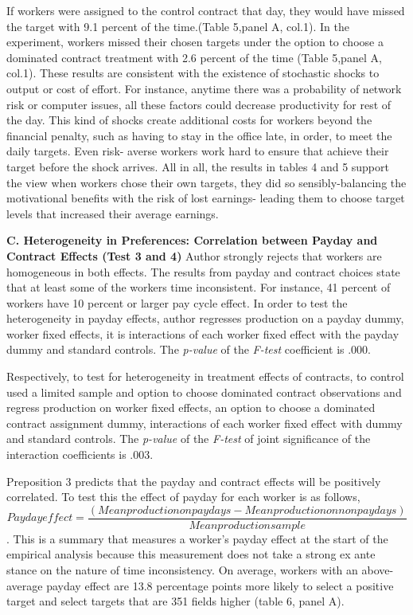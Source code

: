 \documentclass[a4paper,12pt]{article}
\begin{document}
If workers were assigned to the control contract that day, they would have missed the target with 9.1 percent of the time.(Table 5,panel A, col.1). In the experiment, workers missed their chosen targets under the option to choose a dominated contract treatment with 2.6 percent of the time (Table 5,panel A, col.1). These results are consistent with the existence of stochastic shocks to output or cost of effort. For instance, anytime there was a probability of network risk or computer issues, all these factors could decrease productivity for rest of the day. This kind of shocks create additional costs for workers beyond the financial penalty, such as having to stay in the office late, in order, to meet the daily targets. Even risk- averse workers work hard to ensure that achieve their target before the shock arrives. All in all, the results in tables 4 and 5 support the view when workers chose their own targets, they did so sensibly-balancing the motivational benefits with the risk of lost earnings- leading them to choose target levels that increased their average earnings.   


\textbf{C. Heterogeneity in Preferences: Correlation between Payday and Contract Effects (Test 3 and 4)}
Author strongly rejects that workers are homogeneous in both effects. The results from payday and contract choices state that at least some of the workers time inconsistent. For instance, 41 percent of workers have 10 percent or larger pay cycle effect. 
In order to test the heterogeneity in payday effects, author regresses production on a payday dummy, worker fixed effects, it is interactions of each worker fixed effect with the payday dummy and standard controls. The \textit{p-value} of the \textit{F-test} coefficient is .000.

Respectively, to test for heterogeneity in treatment effects of contracts, to control used a limited sample and option to choose dominated contract observations and regress production on worker fixed effects, an option to choose a dominated contract assignment dummy, interactions of each worker fixed effect with dummy and standard controls. The \textit{p-value} of the \textit{F-test} of joint significance of the interaction coefficients is .003. 

Preposition 3 predicts that the payday and contract effects will be positively correlated. To test this the effect of payday for each worker is as follows, 
$$Payday effect = \frac{(Mean production  on paydays - Mean production on non paydays)}{Mean production sample}$$. This is a summary that measures a worker's payday effect at the start of the empirical analysis because this measurement does not take a strong ex ante stance on the nature of time inconsistency. On average, workers with an above-average payday effect are 13.8 percentage points more likely to select a positive target and select targets that are 351 fields higher (table 6, panel A).    
\end{document}
